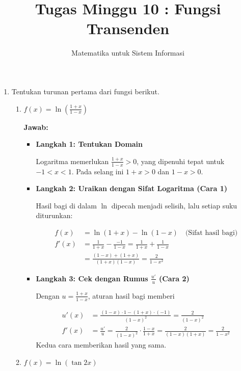 \documentclass[10pt,a4paper]{article}
\title{Tugas Minggu 10 : Fungsi Transenden}
\author{Matematika untuk Sistem Informasi}
\date{}
\newcounter{eqblock}
\newcommand{\reseteq}{%
  \stepcounter{eqblock}%
  \setcounter{equation}{0}%
  \renewcommand{\theHequation}{\arabic{eqblock}.\arabic{equation}}%
}
\begin{document}
\maketitle

\begin{enumerate}

\item Tentukan turunan pertama dari fungsi berikut.
\begin{enumerate}

\item $\displaystyle f(x) = \ln\left(\frac{1 + x}{1 - x}\right)$

\textbf{Jawab:}
\begin{itemize}
\item \textbf{Langkah 1: Tentukan Domain}

Logaritma memerlukan $\frac{1 + x}{1 - x} > 0$, yang dipenuhi tepat untuk $-1 < x < 1$. Pada selang ini $1 + x > 0$ dan $1 - x > 0$.

\item \textbf{Langkah 2: Uraikan dengan Sifat Logaritma (Cara 1)}

Hasil bagi di dalam $\ln$ dipecah menjadi selisih, lalu setiap suku diturunkan:
\reseteq
\begin{align}
f(x) &= \ln(1 + x) - \ln(1 - x) \quad \text{(Sifat hasil bagi)} \\
f'(x) &= \frac{1}{1 + x} - \frac{-1}{1 - x} = \frac{1}{1 + x} + \frac{1}{1 - x} \\
&= \frac{(1 - x) + (1 + x)}{(1 + x)(1 - x)} = \frac{2}{1 - x^2}
\end{align}

\item \textbf{Langkah 3: Cek dengan Rumus $\frac{u'}{u}$ (Cara 2)}

Dengan $u = \frac{1 + x}{1 - x}$, aturan hasil bagi memberi
\reseteq
\begin{align}
u'(x) &= \frac{(1 - x) \cdot 1 - (1 + x) \cdot (-1)}{(1 - x)^2} = \frac{2}{(1 - x)^2} \\
f'(x) &= \frac{u'}{u} = \frac{2}{(1 - x)^2} \cdot \frac{1 - x}{1 + x} = \frac{2}{(1 - x)(1 + x)} = \frac{2}{1 - x^2}
\end{align}
Kedua cara memberikan hasil yang sama.
\end{itemize}

\item $f(x) = \ln(\tan 2x)$


\end{enumerate}
\end{enumerate}
\end{document}
